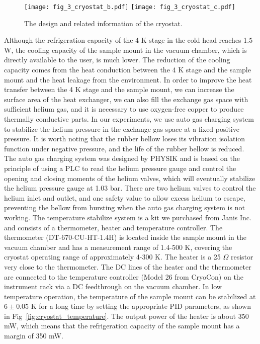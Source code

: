 \begin{figure}
    \centering
    {\texttt{[image: fig\_3\_cryostat\_b.pdf]}}
    {\texttt{[image: fig\_3\_cryostat\_c.pdf]}}
    \caption{The design and related information of the cryostat.}
    \label{fig:cryostat}
\end{figure}

Although the refrigeration capacity of the 4 K stage in the cold head reaches 1.5 W, the cooling capacity of the sample mount in the vacuum chamber, which is directly available to the user, is much lower. The reduction of the cooling capacity comes from the heat conduction between the 4 K stage and the sample mount and the heat leakage from the environment. In order to improve the heat transfer between the 4 K stage and the sample mount, we can increase the surface area of the heat exchanger, we can also fill the exchange gas space with sufficient helium gas, and it is necessary to use oxygen-free copper to produce thermally conductive parts. In our experiments, we use auto gas charging system to stabilize the helium pressure in the exchange gas space at a fixed positive pressure. It is worth noting that the rubber bellow loses its vibration isolation function under negative pressure, and the life of the rubber bellow is reduced. The auto gas charging system was designed by PHYSIK and is based on the principle of using a PLC to read the helium pressure gauge and control the opening and closing moments of the helium valves, which will eventually stabilize the helium pressure gauge at 1.03 bar. There are two helium valves to control the helium inlet and outlet, and one safety value to allow excess helium to escape, preventing the bellow from bursting when the auto gas charging system is not working. The temperature stabilize system is a kit we purchased from Janis Inc. and consists of a thermometer, heater and temperature controller. The thermometer (DT-670-CU-HT-1.4H) is located inside the sample mount in the vacuum chamber and has a measurement range of 1.4-500 K, covering the cryostat operating range of approximately 4-300 K. The heater is a 25 $\Omega$ resistor very close to the thermometer. The DC lines of the heater and the thermometer are connected to the temperature controller (Model 26 from CryoCon) on the instrument rack via a DC feedthrough on the vacuum chamber. In low temperature operation, the temperature of the sample mount can be stabilized at $6 \pm 0.05$ K for a long time by setting the appropriate PID parameters, as shown in Fig~\ref{fig:cryostat_temperature}. The output power of the heater is about 350 mW, which means that the refrigeration capacity of the sample mount has a margin of 350 mW.

